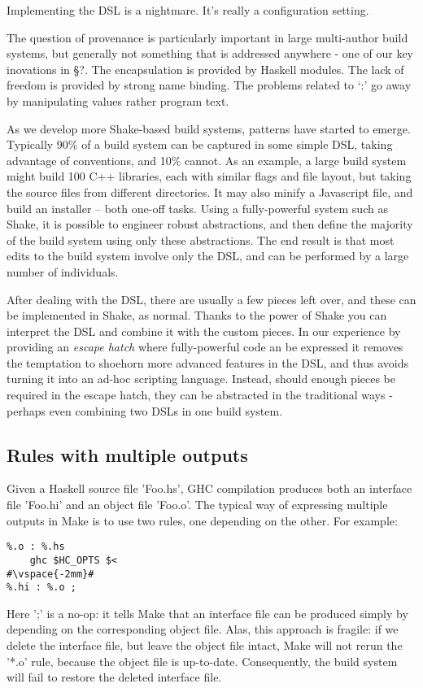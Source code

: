 Implementing the DSL is a nightmare. It's really a configuration setting.

The question of provenance is particularly important in large multi-author build
systems, but generally not something that is addressed anywhere - one of our key
inovations in \S?. The encapsulation is provided by Haskell modules. The lack of
freedom is provided by strong name binding. The problems related to `:' go away
by manipulating values rather program text.


As we develop more Shake-based build systems, patterns have started to emerge.
Typically 90\% of a build system can be captured in some simple DSL, taking
advantage of conventions, and 10\% cannot. As an example, a large build system
might build 100 C++ libraries, each with similar flags and file layout, but
taking the source files from different directories. It may also minify a
Javascript file, and build an installer -- both one-off tasks. Using a
fully-powerful system such as Shake, it is possible to engineer robust
abstractions, and then define the majority of the build system using only these
abstractions. The end result is that most edits to the build system involve only
the DSL, and can be performed by a large number of individuals.

After dealing with the DSL, there are usually a few pieces left over, and these
can be implemented in Shake, as normal. Thanks to the power of Shake you can
interpret the DSL and combine it with the custom pieces. In our experience by
providing an \emph{escape hatch} where fully-powerful code an be expressed it
removes the temptation to shoehorn more advanced features in the DSL, and thus
avoids turning it into an ad-hoc scripting language. Instead, should enough
pieces be required in the escape hatch, they can be abstracted in the
traditional ways - perhaps even combining two DSLs in one build system.

\subsection{Rules with multiple outputs\label{sec:multiple-outputs}}

Given a Haskell source file \lst'Foo.hs', GHC compilation produces both an
interface file \lst'Foo.hi' and an object file \lst'Foo.o'. The typical way of
expressing multiple outputs in Make is to use two rules, one depending
on the other. For example:

\begin{lstlisting}
%.o : %.hs
    ghc $HC_OPTS $<
#\vspace{-2mm}#
%.hi : %.o ;
\end{lstlisting}
\noindent Here \lst';' is a no-op: it tells Make that an interface file can be
produced simply by depending on the corresponding object file. Alas, this
approach is fragile: if we delete the interface file, but leave the object
file intact, Make will not rerun the \lst'*.o' rule, because the object file is
up-to-date. Consequently, the build system will fail to restore the deleted
interface file.

